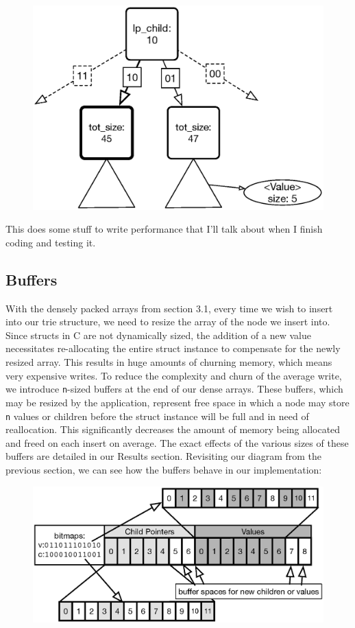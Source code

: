 \documentclass[preprint]{sigplanconf}
\begin{document}
\begin{figure}[H]
\includegraphics[scale=.45]{balancing2}
\centering
\end{figure}
This does some stuff to write performance that I'll talk about when I finish coding and testing it.
\subsection{Buffers}
With the densely packed arrays from section 3.1, every time we wish to insert into our trie structure, we need to resize the array of the node we insert into.
Since structs in C are not dynamically sized, the addition of a new value necessitates re-allocating the entire struct instance to compensate for the newly resized array.
This results in huge amounts of churning memory, which means very expensive writes.
To reduce the complexity and churn of the average write, we introduce \texttt{n}-sized buffers at the end of our dense arrays.
These buffers, which may be resized by the application, represent free space in which a node may store \texttt{n} values or children before the struct instance will be full and in need of reallocation.
This significantly decreases the amount of memory being allocated and freed on each insert on average. The exact effects of the various sizes of these buffers are detailed in our Results section.
Revisiting our diagram from the previous section, we can see how the buffers behave in our implementation:
\begin{figure}[H]
\includegraphics[scale=.42]{buffers}
\centering
\end{figure}
\end{document}

